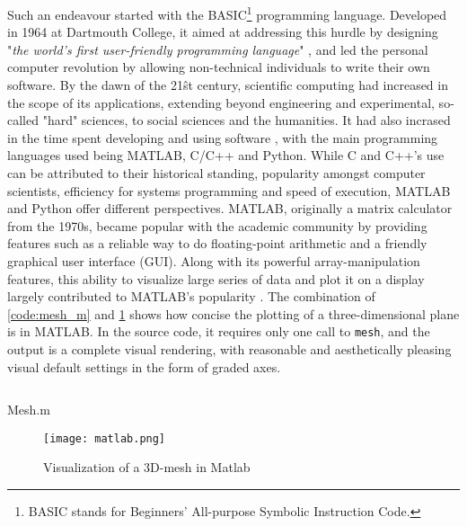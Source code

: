 Such an endeavour started with the BASIC\footnote{BASIC stands for Beginners' All-purpose Symbolic Instruction Code.} programming language. Developed in 1964 at Dartmouth College, it aimed at addressing this hurdle by designing "\emph{the world's first user-friendly programming language}" \citep{brooks_finally_2019}, and led the personal computer revolution by allowing non-technical individuals to write their own software. By the dawn of the 21\^{st} century, scientific computing had increased in the scope of its applications, extending beyond engineering and experimental, so-called "hard" sciences, to social sciences and the humanities. It had also incrased in the time spent developing and using software \citep{prabhu_survey_2011,hannay_how_2009}, with the main programming languages used being MATLAB, C/C++ and Python. While C and C++'s use can be attributed to their historical standing, popularity amongst computer scientists, efficiency for systems programming and speed of execution, MATLAB and Python offer different perspectives. MATLAB, originally a matrix calculator from the 1970s, became popular with the academic community by providing features such as a reliable way to do floating-point arithmetic and a friendly graphical user interface (GUI). Along with its powerful array-manipulation features, this ability to visualize large series of data and plot it on a display largely contributed to MATLAB's popularity \citep{moler_history_2020}. The combination of \ref{code:mesh_m} and \ref{graphic:mesh-visualization} shows how concise the plotting of a three-dimensional plane is in MATLAB. In the source code, it requires only one call to \lstinline{mesh}, and the output is a complete visual rendering, with reasonable and aesthetically pleasing visual default settings in the form of graded axes.

\begin{listing}
  \inputminted{matlab}{./corpus/mesh.matlab}
  \caption{Mesh.m}
  \label{code:mesh_m}
\end{listing}

\begin{figure}
  \texttt{[image: matlab.png]}
  \caption{Visualization of a 3D-mesh in Matlab}
  \label{graphic:mesh-visualization}
\end{figure}

